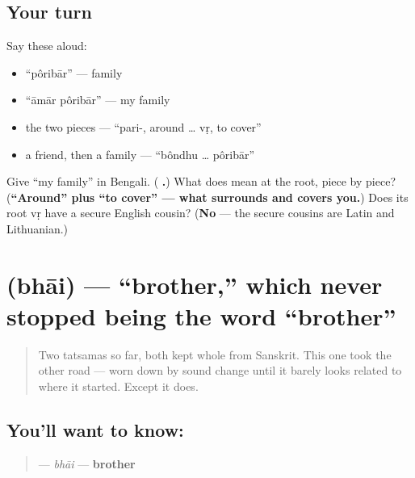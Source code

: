 \subsection*{Your turn}
Say these aloud:

\begin{itemize}
\raggedright
  \item \textquotedblleft{}pôribār\textquotedblright{} — family
  \item \textquotedblleft{}āmār pôribār\textquotedblright{} — my family
  \item the two pieces — \textquotedblleft{}pari-, around … vṛ, to cover\textquotedblright{}
  \item a friend, then a family — \textquotedblleft{}bôndhu … pôribār\textquotedblright{}
\end{itemize}

\begin{tcolorbox}[breakable,colback=teal!4,colframe=teal!35!black,title={Before you move on}]
Give \textquotedblleft{}my family\textquotedblright{} in Bengali. (\textbf{ .}) What does  mean at the root, piece by piece? (\textbf{\textquotedblleft{}Around\textquotedblright{} plus \textquotedblleft{}to cover\textquotedblright{} — what surrounds and covers you.}) Does its root vṛ have a secure English cousin? (\textbf{No} — the secure cousins are Latin and Lithuanian.)
\end{tcolorbox}
\section[bhāi]{ (bhāi) — \textquotedblleft{}brother,\textquotedblright{} which never stopped being the word \textquotedblleft{}brother\textquotedblright{}}

\label{lesson:BN-C11-bhai}



\begin{quote}
Two tatsamas so far, both kept whole from Sanskrit. This one took the other road — worn down by sound change until it barely looks related to where it started. Except it does.
\end{quote}

\subsection*{You'll want to know: }
\begin{quote}
\textbf{} — \emph{bhāi} — \textbf{brother}
\end{quote}

